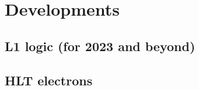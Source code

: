 \clearpage
\section{Developments}
\label{sec:developments}


\subsection{L1 logic (for 2023 and beyond)}
\label{sec:l1-logic-dev}

\subsection{HLT electrons}
\label{sec:hlt-electrons}
